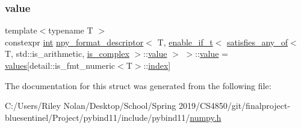 \subsubsection{\texorpdfstring{value}{value}}
{\footnotesize\ttfamily template$<$typename T $>$ \\
constexpr \mbox{\hyperlink{warnings_8h_a74f207b5aa4ba51c3a2ad59b219a423b}{int}} \mbox{\hyperlink{structnpy__format__descriptor}{npy\+\_\+format\+\_\+descriptor}}$<$ T, \mbox{\hyperlink{detail_2common_8h_a012819c9e8b5e04872a271f50f8b8196}{enable\+\_\+if\+\_\+t}}$<$ \mbox{\hyperlink{detail_2common_8h_ad73b2ed543c4e4522fc571f41e31781b}{satisfies\+\_\+any\+\_\+of}}$<$ T, std\+::is\+\_\+arithmetic, \mbox{\hyperlink{structis__complex}{is\+\_\+complex}} $>$\+::\mbox{\hyperlink{_s_d_l__opengl__glext_8h_a8ad81492d410ff2ac11f754f4042150f}{value}} $>$ $>$\+::\mbox{\hyperlink{_s_d_l__opengl__glext_8h_a8ad81492d410ff2ac11f754f4042150f}{value}} = \mbox{\hyperlink{_s_d_l__opengl__glext_8h_a0aa8cf39c79d294b1d9f4daef5020bec}{values}}\mbox{[}detail\+::is\+\_\+fmt\+\_\+numeric$<$T$>$\+::\mbox{\hyperlink{_s_d_l__opengl__glext_8h_a57f14e05b1900f16a2da82ade47d0c6d}{index}}\mbox{]}\hspace{0.3cm}{\ttfamily [static]}}



The documentation for this struct was generated from the following file\+:\begin{DoxyCompactItemize}
\item 
C\+:/\+Users/\+Riley Nolan/\+Desktop/\+School/\+Spring 2019/\+C\+S4850/git/finalproject-\/bluesentinel/\+Project/pybind11/include/pybind11/\mbox{\hyperlink{numpy_8h}{numpy.\+h}}\end{DoxyCompactItemize}
